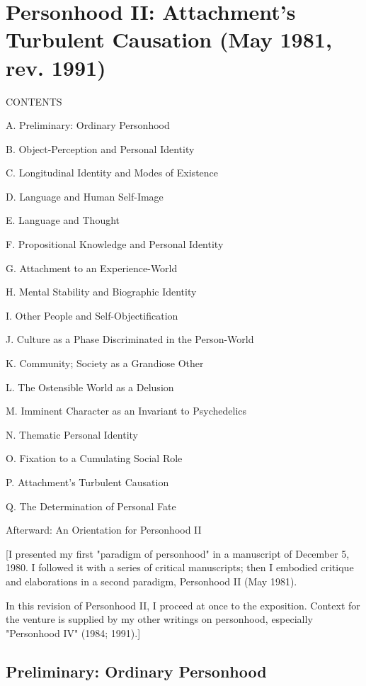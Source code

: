 \chapter{Personhood II: Attachment's Turbulent Causation (May 1981, rev. 1991)}

CONTENTS

    A. Preliminary: Ordinary Personhood

    B. Object-Perception and Personal Identity

    C. Longitudinal Identity and Modes of Existence

    D. Language and Human Self-Image

    E. Language and Thought

    F. Propositional Knowledge and Personal Identity

    G. Attachment to an Experience-World

    H. Mental Stability and Biographic Identity

    I. Other People and Self-Objectification

    J. Culture as a Phase Discriminated in the Person-World

    K. Community; Society as a Grandiose Other

    L. The Ostensible World as a Delusion

    M. Imminent Character as an Invariant to Psychedelics

    N. Thematic Personal Identity

    O. Fixation to a Cumulating Social Role

    P. Attachment's Turbulent Causation

    Q. The Determination of Personal Fate

    Afterward: An Orientation for Personhood II

[I presented my first "paradigm of personhood" in a manuscript of December 5, 1980. I followed it with a series of critical manuscripts; then I embodied critique and elaborations in a second paradigm, Personhood II (May 1981).

In this revision of Personhood II, I proceed at once to the exposition. Context for the venture is supplied by my other writings on personhood, especially "Personhood IV" (1984; 1991).]

\section{Preliminary: Ordinary Personhood}

